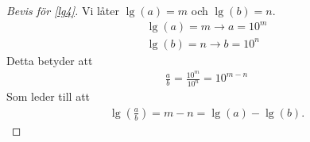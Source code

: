 \begin{proof}[Bevis för \eqref{lg4}]
	Vi låter $\lg(a) = m$ och $\lg(b) = n$.
	\begin{align}
		\lg(a) = m \rightarrow a = 10^m \\
		\lg(b) = n \rightarrow b = 10^n
	\end{align}
	Detta betyder att
	\begin{align}
		\frac{a}{b} = \frac{10^m}{10^n} = 10^{m-n}
	\end{align}
	Som leder till att
	\begin{align}
		\lg\left(\frac{a}{b}\right) = m-n = \lg(a)-\lg(b).
	\end{align}
\end{proof}










































































